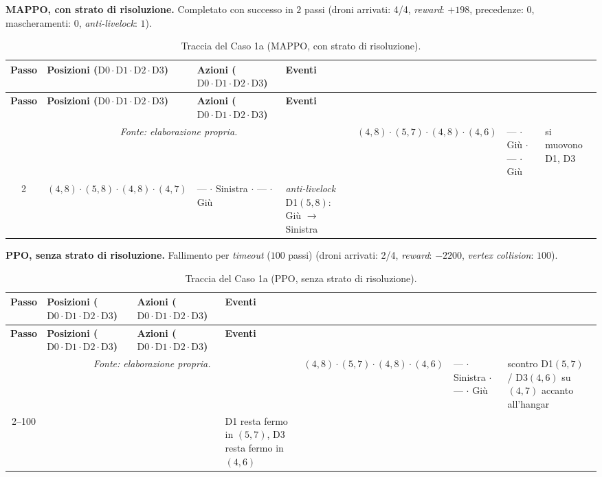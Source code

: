 \documentclass[12pt,a4paper,twoside]{report}
\begin{document}
\noindent\textbf{MAPPO, con strato di risoluzione.} Completato con successo in $2$ passi (droni arrivati: 4/4, \emph{reward}: $+198$, precedenze: $0$, mascheramenti: $0$, \emph{anti-livelock}: $1$).

{\footnotesize
\setlength{\tabcolsep}{3.5pt}
\begin{longtable}{c l l >{\raggedright\arraybackslash}p{3.8cm}}
\caption{Traccia del Caso 1a (MAPPO, con strato di risoluzione).}\\
\toprule
\textbf{Passo} & \textbf{Posizioni ($\text{D0} \cdot \text{D1} \cdot \text{D2} \cdot \text{D3}$)} & \textbf{Azioni ($\text{D0} \cdot \text{D1} \cdot \text{D2} \cdot \text{D3}$)} & \textbf{Eventi} \\
\midrule
\endfirsthead
\toprule
\textbf{Passo} & \textbf{Posizioni ($\text{D0} \cdot \text{D1} \cdot \text{D2} \cdot \text{D3}$)} & \textbf{Azioni ($\text{D0} \cdot \text{D1} \cdot \text{D2} \cdot \text{D3}$)} & \textbf{Eventi} \\
\midrule
\endhead
\bottomrule
\multicolumn{4}{c}{\footnotesize\emph{Fonte: elaborazione propria.}}
\endlastfoot
1 & $(4, 8) \cdot (5, 7) \cdot (4, 8) \cdot (4, 6)$ & --- $\cdot$ Giù $\cdot$ --- $\cdot$ Giù      & si muovono D1, D3 \\*
2 & $(4, 8) \cdot (5, 8) \cdot (4, 8) \cdot (4, 7)$ & --- $\cdot$ Sinistra $\cdot$ --- $\cdot$ Giù & \emph{anti-livelock} D1$(5, 8)$: Giù $\to$ Sinistra \\*
\end{longtable}
}

\noindent\textbf{PPO, senza strato di risoluzione.} Fallimento per \emph{timeout} ($100$ passi) (droni arrivati: 2/4, \emph{reward}: $-2200$, \emph{vertex collision}: $100$).

{\footnotesize
\setlength{\tabcolsep}{3.5pt}
\begin{longtable}{c l l >{\raggedright\arraybackslash}p{3.8cm}}
\caption{Traccia del Caso 1a (PPO, senza strato di risoluzione).}\\
\toprule
\textbf{Passo} & \textbf{Posizioni ($\text{D0} \cdot \text{D1} \cdot \text{D2} \cdot \text{D3}$)} & \textbf{Azioni ($\text{D0} \cdot \text{D1} \cdot \text{D2} \cdot \text{D3}$)} & \textbf{Eventi} \\
\midrule
\endfirsthead
\toprule
\textbf{Passo} & \textbf{Posizioni ($\text{D0} \cdot \text{D1} \cdot \text{D2} \cdot \text{D3}$)} & \textbf{Azioni ($\text{D0} \cdot \text{D1} \cdot \text{D2} \cdot \text{D3}$)} & \textbf{Eventi} \\
\midrule
\endhead
\bottomrule
\multicolumn{4}{c}{\footnotesize\emph{Fonte: elaborazione propria.}}
\endlastfoot
1      & $(4, 8) \cdot (5, 7) \cdot (4, 8) \cdot (4, 6)$ & --- $\cdot$ Sinistra $\cdot$ --- $\cdot$ Giù & scontro D1$(5, 7)$ / D3$(4, 6)$ su $(4, 7)$ accanto all'hangar \\*
2--100 & & & D1 resta fermo in $(5, 7)$, D3 resta fermo in $(4, 6)$ \\*
\end{longtable}
}
\end{document}
